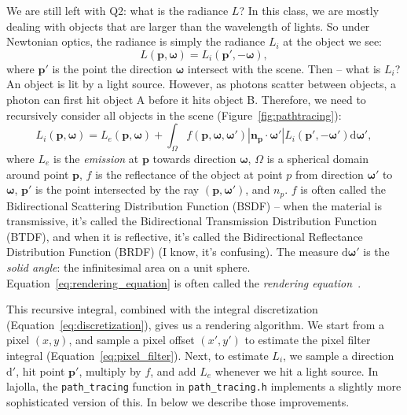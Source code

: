 We are still left with Q2: what is the radiance $L$? In this class, we are mostly dealing with objects that are larger than the wavelength of lights. So under Newtonian optics, the radiance is simply the radiance $L_i$ at the object we see:
\begin{equation}
    L(\mathbf{p}, \mathbf{\omega}) = L_i(\mathbf{p}', -\mathbf{\omega}),
\end{equation}
where $\mathbf{p}'$ is the point the direction $\mathbf{\omega}$ intersect with the scene. Then -- what is $L_i$? An object is lit by a light source. However, as photons scatter between objects, a photon can first hit object A before it hits object B. Therefore, we need to recursively consider all objects in the scene (Figure~\ref{fig:pathtracing}):
\begin{equation}
    L_i(\mathbf{p}, \mathbf{\omega}) = L_e(\mathbf{p}, \mathbf{\omega}) + \int_{\Omega} f(\mathbf{p}, \mathbf{\omega}, \mathbf{\omega}') |\mathbf{n}_{\mathbf{p}} \cdot \mathbf{\omega}'| L_i(\mathbf{p}', -\mathbf{\omega}') \mathrm{d} \mathbf{\omega}',
    \label{eq:rendering_equation}
\end{equation}
where $L_e$ is the \emph{emission} at $\mathbf{p}$ towards direction $\mathbf{\omega}$, $\Omega$ is a spherical domain around point $\mathbf{p}$, $f$ is the reflectance of the object at point $p$ from direction $\mathbf{\omega}'$ to $\mathbf{\omega}$, $\mathbf{p}'$ is the point intersected by the ray $(\mathbf{p}, \mathbf{\omega}')$, and $n_{p}$. $f$ is often called the Bidirectional Scattering Distribution Function (BSDF) -- when the material is transmissive, it's called the Bidirectional Transmission Distribution Function (BTDF), and when it is reflective, it's called the Bidirectional Reflectance Distribution Function (BRDF) (I know, it's confusing). The measure $\mathrm{d} \mathbf{\omega}'$ is the \emph{solid angle}: the infinitesimal area on a unit sphere. Equation~\ref{eq:rendering_equation} is often called the \emph{rendering equation}~\cite{Kajiya:1986:RE}.

This recursive integral, combined with the integral discretization (Equation~\ref{eq:discretization}), gives us a rendering algorithm. We start from a pixel $(x, y)$, and sample a pixel offset $(x', y')$ to estimate the pixel filter integral (Equation~\ref{eq:pixel_filter}). Next, to estimate $L_i$, we sample a direction $\mathrm{d}'$, hit point $\mathbf{p}'$, multiply by $f$, and add $L_e$ whenever we hit a light source. In lajolla, the \lstinline{path_tracing} function in \lstinline{path_tracing.h} implements a slightly more sophisticated version of this. In below we describe those improvements.

